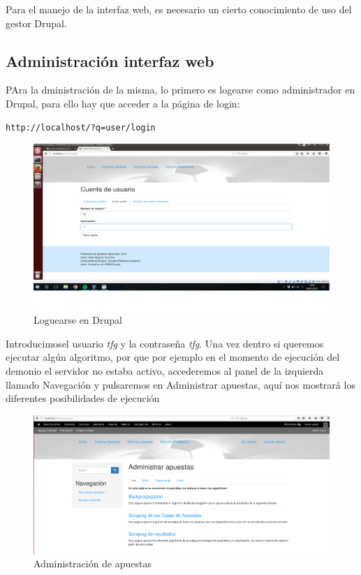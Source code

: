 Para el manejo de la interfaz web, es necesario un cierto conocimiento de uso del gestor Drupal.

\subsection{Administración interfaz web}
PAra la dministración de la misma, lo primero es logearse como administrador en Drupal, para ello hay que acceder a la página de login:
\begin{lstlisting}[language=html,keywordstyle=\color{black}]
http://localhost/?q=user/login
\end{lstlisting}
\begin{figure}
\centering
\includegraphics[width=.9\textwidth]{img/drupal_login}
\caption{Loguearse en Drupal}
\label{fig:AdminAp}
\end{figure}
Introducimosel usuario \textit{tfg} y la contraseña \textit{tfg}. Una vez dentro si queremos ejecutar algún algoritmo, por que por ejemplo en el momento de ejecución del demonio el servidor no estaba activo, accederemos al panel de la izquierda llamado Navegación y pulsaremos en Administrar apuestas, aquí nos mostrará los diferentes posibilidades de ejecución
\begin{figure}
\centering
\includegraphics[width=.9\textwidth]{img/drupal_admin_apuestas}
\caption{Administración de apuestas}
\label{fig:AdminAp}
\end{figure}

